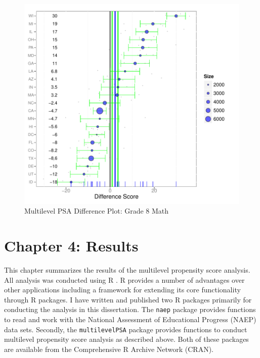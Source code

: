 \documentclass[letterpaper,12p,twoside]{article} %
\begin{document}
\begin{figure}[tp]
\begin{center}
\includegraphics[height=\textwidth]{../Figures2009/g8math-mlpsa-lr-diff.pdf}
\caption{Multilevel PSA Difference Plot: Grade 8 Math}
\label{fig:g8math:diff}
\end{center}
\end{figure}


\cleardoublepage
\section{Chapter 4: Results}

This chapter summarizes the results of the multilevel propensity score analysis. All analysis was conducted using R \cite{redevelopment}. R provides a number of advantages over other applications including a framework for extending its core functionality through R packages. I have written and published two R packages primarily for conducting the analysis in this dissertation. The \texttt{naep} package provides functions to read and work with the National Assessment of Educational Progress (NAEP) data sets. Secondly, the \texttt{multilevelPSA} package provides functions to conduct multilevel propensity score analysis as described above. Both of these packages are available from the Comprehensive R Archive Network (CRAN).
\end{document}

